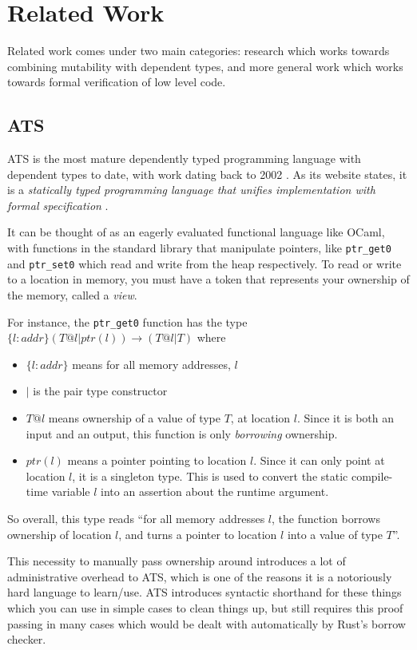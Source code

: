 \documentclass[12pt,twoside]{report}
\begin{document}
\section{Related Work}
\label{section:relatedwork}
Related work comes under two main categories: research which works towards combining mutability with dependent types, and more general work which works towards formal verification of low level code.


\subsection{ATS}
ATS \citep{xiAppliedTypeSystem2017} is the most mature dependently typed programming language with dependent types to date, with work dating back to 2002 \citep{ATSImplements}. As its website states, it is a \textit{statically typed programming language that unifies implementation with formal specification} \citep{ATSHome}.

It can be thought of as an eagerly evaluated functional language like OCaml, with functions in the standard library that manipulate pointers, like \verb|ptr_get0| and \verb|ptr_set0| which read and write from the heap respectively. To read or write to a location in memory, you must have a token that represents your ownership of the memory, called a \textit{view}.

For instance, the \verb|ptr_get0| function has the type $\{l:addr\} (T @ l | ptr (l)) \rightarrow (T @ l | T)$ where
\begin{itemize}
  \item $\{l:addr\}$ means for all memory addresses, $l$
  \item $|$ is the pair type constructor
  \item $T @ l$ means ownership of a value of type $T$, at location $l$. Since it is both an input and an output, this function is only \textit{borrowing} ownership.
  \item $ptr(l)$ means a pointer pointing to location $l$. Since it can only point at location $l$, it is a singleton type. This is used to convert the static compile-time variable $l$ into an assertion about the runtime argument.
\end{itemize}

So overall, this type reads ``for all memory addresses $l$, the function borrows ownership of location $l$, and turns a pointer to location $l$ into a value of type $T$''.

This necessity to manually pass ownership around introduces a lot of administrative overhead to ATS, which is one of the reasons it is a notoriously hard language to learn/use. ATS introduces syntactic shorthand for these things which you can use in simple cases to clean things up, but still requires this proof passing in many cases which would be dealt with automatically by Rust's borrow checker.
\end{document}
